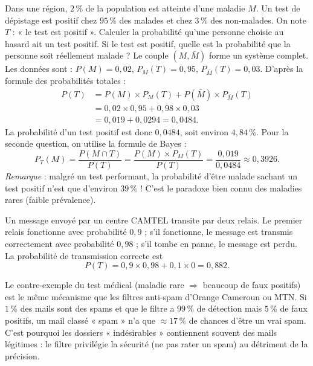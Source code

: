 \documentclass[11pt]{article}
\begin{document}
\begin{exoresolu}
Dans une région, $2\,\%$ de la population est atteinte d'une maladie $M$. Un test de dépistage est positif chez $95\,\%$ des malades et chez $3\,\%$ des non-malades. On note $T$ : « le test est positif ». Calculer la probabilité qu'une personne choisie au hasard ait un test positif. Si le test est positif, quelle est la probabilité que la personne soit réellement malade ?
\tcblower
Le couple $(M,\bar{M})$ forme un système complet. Les données sont :
$P(M)=0{,}02$, $P_M(T)=0{,}95$, $P_{\bar{M}}(T)=0{,}03$.
D'après la formule des probabilités totales :
\begin{align*}
P(T) &= P(M)\times P_M(T)+P(\bar{M})\times P_{\bar{M}}(T)\\
&= 0{,}02\times 0{,}95 + 0{,}98\times 0{,}03\\
&= 0{,}019 + 0{,}0294 = 0{,}0484.
\end{align*}
La probabilité d'un test positif est donc $0{,}0484$, soit environ $4{,}84\,\%$.
\medskip
Pour la seconde question, on utilise la formule de Bayes :
\[ P_T(M)=\dfrac{P(M\cap T)}{P(T)}=\dfrac{P(M)\times P_M(T)}{P(T)}=\dfrac{0{,}019}{0{,}0484}\approx 0{,}3926. \]
\emph{Remarque} : malgré un test performant, la probabilité d'être malade sachant un test positif n'est que d'environ $39\,\%$ ! C'est le paradoxe bien connu des maladies rares (faible prévalence).
\end{exoresolu}

\begin{exemplebox}
Un message envoyé par un centre CAMTEL transite par deux relais. Le premier relais fonctionne avec probabilité $0{,}9$ ; s'il fonctionne, le message est transmis correctement avec probabilité $0{,}98$ ; s'il tombe en panne, le message est perdu. La probabilité de transmission correcte est
\[ P(T)=0{,}9\times 0{,}98 + 0{,}1\times 0 = 0{,}882. \]
\end{exemplebox}

\begin{savaistu}
Le contre-exemple du test médical (maladie rare $\Rightarrow$ beaucoup de faux positifs) est le même mécanisme que les filtres anti-spam d'Orange Cameroun ou MTN. Si $1\,\%$ des mails sont des spams et que le filtre a $99\,\%$ de détection mais $5\,\%$ de faux positifs, un mail classé « spam » n'a que $\approx 17\,\%$ de chances d'être un vrai spam. C'est pourquoi les dossiers « indésirables » contiennent souvent des mails légitimes : le filtre privilégie la sécurité (ne pas rater un spam) au détriment de la précision.
\end{savaistu}
\end{document}
